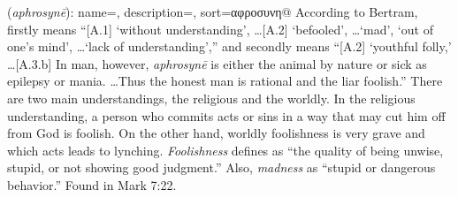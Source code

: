 \item[Foolishness,]

(\textit{aphrosynē}):
{
    name=,
    description={},
    sort=αφροσυνη@
}
According to Bertram, firstly  means ``[A.1] `without understanding', \ldots [A.2] `befooled', \ldots `mad', `out of one's mind',  \ldots `lack of understanding',''
and secondly  means ``[A.2] `youthful folly,' \ldots [A.3.b] In man, however, \emph{aphrosynē} is either the animal by nature or sick as epilepsy or mania. \ldots Thus the honest man is rational and the liar foolish.''
There are two main understandings, the religious and the worldly. In the religious understanding, a person who commits acts or sins in a way that may cut him off from God is foolish. On the other hand, worldly foolishness is very grave and which acts leads to lynching. \emph{Foolishness} defines as ``the quality of being unwise, stupid, or not showing good judgment.'' Also, \emph{madness} as ``stupid or dangerous behavior.''
Found in Mark 7:22.
